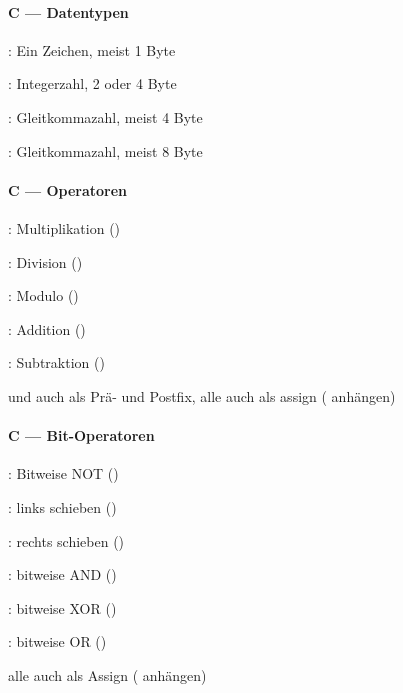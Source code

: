 \newpage

\paragraph{C --- Datentypen}
\begin{items}
  \item \underline{}: Ein Zeichen, meist 1 Byte
  \item \underline{}: Integerzahl, 2 oder 4 Byte
  \item \underline{}: Gleitkommazahl, meist 4 Byte
  \item \underline{}: Gleitkommazahl, meist 8 Byte
\end{items}

\paragraph{C --- Operatoren}
\begin{items}
  \item \underline{\code{*}}: Multiplikation ()
  \item \underline{\code{/}}: Division ()
  \item \underline{\code{\%}}: Modulo ()
  \item \underline{\code{+}}: Addition ()
  \item \underline{\code{-}}: Subtraktion ()
  \item \code{+} und \code{-} auch als Prä- und Postfix, alle auch als assign (\code{=} anhängen)
\end{items}

\paragraph{C --- Bit-Operatoren}
\begin{items}
  \item \underline{\code{\~}}: Bitweise NOT ()
  \item \underline{\code{<<}}: links schieben ()
  \item \underline{\code{>>}}: rechts schieben ()
  \item \underline{\code{&}}: bitweise AND ()
  \item \underline{\code{^}}: bitweise XOR ()
  \item \underline{\code{|}}: bitweise OR ()
  \item alle auch als Assign (\code{=} anhängen)
\end{items}

